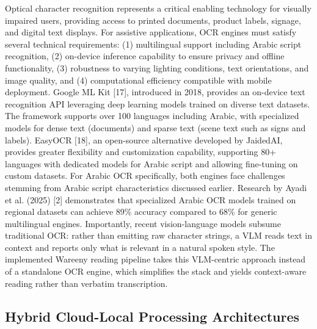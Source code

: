 \documentclass[12pt,a4paper]{report}
\begin{document}
Optical character recognition represents a critical enabling technology for visually impaired users, providing access to printed documents, product labels, signage, and digital text displays. For assistive applications, OCR engines must satisfy several technical requirements: (1) multilingual support including Arabic script recognition, (2) on-device inference capability to ensure privacy and offline functionality, (3) robustness to varying lighting conditions, text orientations, and image quality, and (4) computational efficiency compatible with mobile deployment. Google ML Kit [17], introduced in 2018, provides an on-device text recognition API leveraging deep learning models trained on diverse text datasets. The framework supports over 100 languages including Arabic, with specialized models for dense text (documents) and sparse text (scene text such as signs and labels). EasyOCR [18], an open-source alternative developed by JaidedAI, provides greater flexibility and customization capability, supporting 80+ languages with dedicated models for Arabic script and allowing fine-tuning on custom datasets. For Arabic OCR specifically, both engines face challenges stemming from Arabic script characteristics discussed earlier. Research by Ayadi et al. (2025) [2] demonstrates that specialized Arabic OCR models trained on regional datasets can achieve 89\% accuracy compared to 68\% for generic multilingual engines. Importantly, recent vision-language models subsume traditional OCR: rather than emitting raw character strings, a VLM reads text in context and reports only what is relevant in a natural spoken style. The implemented Wareeny reading pipeline takes this VLM-centric approach instead of a standalone OCR engine, which simplifies the stack and yields context-aware reading rather than verbatim transcription.

\subsection{Hybrid Cloud-Local Processing Architectures}
\end{document}
